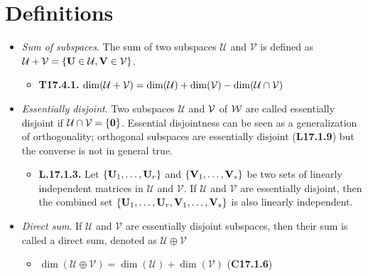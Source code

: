 \documentclass[a4paper, oneside]{book}
\begin{document}
\section{Definitions}
\begin{itemize}
\item \textit{Sum of subspaces}. The sum of two subspaces $\mathcal{U}$ and $\mathcal{V}$ is defined as $\mathcal{U}+\mathcal{V}= \{\mathbf U \in \mathcal{U}, \mathbf V \in \mathcal{V}\}$. 
	\begin{itemize}
	\item \textbf{T17.4.1.} $\dim(\mathcal{U}+\mathcal{V}) = \dim(\mathcal{U}) + \dim(\mathcal{V}) - \dim(\mathcal{U}\cap\mathcal V)$
	\end{itemize}
\item \textit{Essentially disjoint}. Two subspaces $\mathcal{U}$ and $\mathcal V$ of $\mathcal W$ are called essentially disjoint if $\mathcal{U}\cap \mathcal{V} = \{\mathbf 0\}$. Essential disjointness can be seen as a generalization of orthogonality; orthogonal subspaces are essentially disjoint (\textbf{L17.1.9}) but the converse is not in general true.
\begin{itemize}
\item \textbf{L.17.1.3.} Let $\{\mathbf U_1, \dots, \mathbf U_r\}$ and $\{\mathbf V_1, \dots, \mathbf V_s\}$ be two sets of linearly independent matrices in $\mathcal{U}$ and $\mathcal{V}$. If $\mathcal{U}$ and $\mathcal{V}$ are essentially disjoint, then the combined set $\{\mathbf U_1,\dots,\mathbf U_r, \mathbf V_1, \dots, \mathbf V_s\}$ is also linearly independent.
\end{itemize}
\item \textit{Direct sum}. If $\mathcal{U}$ and $\mathcal{V}$ are essentially disjoint subspaces, then their sum is called a direct sum, denoted as $\mathcal{U}\oplus  \mathcal{V}$
	\begin{itemize}
	\item $\dim(\mathcal{U}\oplus \mathcal{V}) = \dim(\mathcal{U})+\dim(\mathcal{V})$ (\textbf{C17.1.6})
	\end{itemize}
\end{itemize}
\end{document}
